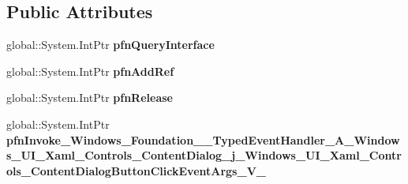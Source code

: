 \subsection*{Public Attributes}
\begin{DoxyCompactItemize}
\item 
\mbox{\label{struct_windows_1_1_foundation_1_1_typed_event_handler___a___windows___u_i___xaml___controls___co8b92684606b505f49919e89761d7b36c_a8d60dbe3d11af2ad606e4814a11a1111}} 
global\+::\+System.\+Int\+Ptr {\bfseries pfn\+Query\+Interface}
\item 
\mbox{\label{struct_windows_1_1_foundation_1_1_typed_event_handler___a___windows___u_i___xaml___controls___co8b92684606b505f49919e89761d7b36c_a77204df586fc0f6182761d442b76b33b}} 
global\+::\+System.\+Int\+Ptr {\bfseries pfn\+Add\+Ref}
\item 
\mbox{\label{struct_windows_1_1_foundation_1_1_typed_event_handler___a___windows___u_i___xaml___controls___co8b92684606b505f49919e89761d7b36c_ab5e594ee8a7ea009cae6913333de671a}} 
global\+::\+System.\+Int\+Ptr {\bfseries pfn\+Release}
\item 
\mbox{\label{struct_windows_1_1_foundation_1_1_typed_event_handler___a___windows___u_i___xaml___controls___co8b92684606b505f49919e89761d7b36c_ad154a913ea062d1b8ce281e6ced07495}} 
global\+::\+System.\+Int\+Ptr {\bfseries pfn\+Invoke\+\_\+\+Windows\+\_\+\+Foundation\+\_\+\+\_\+\+Typed\+Event\+Handler\+\_\+\+A\+\_\+\+Windows\+\_\+\+U\+I\+\_\+\+Xaml\+\_\+\+Controls\+\_\+\+Content\+Dialog\+\_\+j\+\_\+\+Windows\+\_\+\+U\+I\+\_\+\+Xaml\+\_\+\+Controls\+\_\+\+Content\+Dialog\+Button\+Click\+Event\+Args\+\_\+\+V\+\_\+}
\end{DoxyCompactItemize}
